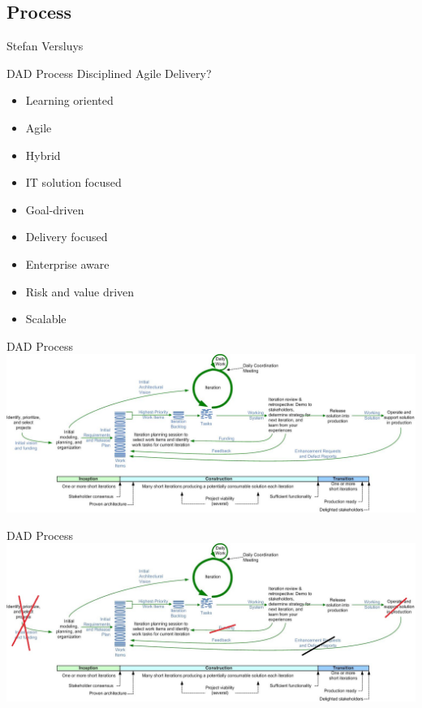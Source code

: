 \begin{frame}
    \section{Process}
    Stefan Versluys
\end{frame}

\begin{frame}[label=process1]{DAD Process}
	Disciplined Agile Delivery?
   \begin{itemize}
		\item Learning oriented
		\item Agile
		\item Hybrid
		\item IT solution focused
		\item Goal-driven
		\item Delivery focused
		\item Enterprise aware
		\item Risk and value driven
		\item Scalable
	\end{itemize} 
\end{frame}

\begin{frame}[label=process2]{DAD Process}
    \includegraphics[width = .9\textwidth]{dadLifecycleUP2}
\end{frame}


\begin{frame}[label=process3]{DAD Process}
    \includegraphics[width = .9\textwidth]{dadLifecycleUP2s}
\end{frame}

